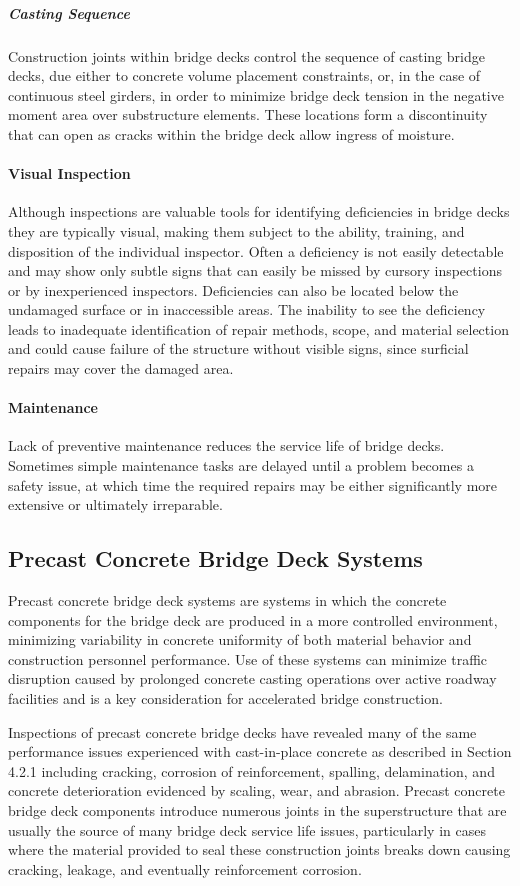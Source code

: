\subparagraph{Casting Sequence}
Construction joints within bridge decks control the sequence of casting bridge decks, due either to concrete
volume placement constraints, or, in the case of continuous steel girders, in order to minimize bridge deck tension in the negative moment area over substructure elements. These locations form a discontinuity that can open as cracks
within the bridge deck allow ingress of moisture.


\paragraph{Visual Inspection}
Although inspections are valuable tools for identifying deficiencies in bridge decks they are typically visual,
making them subject to the ability, training, and disposition of the individual inspector. Often a deficiency is not
easily detectable and may show only subtle signs that can easily be missed by cursory inspections or by
inexperienced inspectors. Deficiencies can also be located below the undamaged surface or in inaccessible areas. The
inability to see the deficiency leads to inadequate identification of repair methods, scope, and material selection and
could cause failure of the structure without visible signs, since surficial repairs may cover the damaged area.

\paragraph{Maintenance}
Lack of preventive maintenance reduces the service life of bridge decks. Sometimes simple maintenance tasks
are delayed until a problem becomes a safety issue, at which time the required repairs may be either significantly
more extensive or ultimately irreparable.


\subsection{Precast Concrete Bridge Deck Systems}
Precast concrete bridge deck systems are systems in which the concrete components for the bridge deck are
produced in a more controlled environment, minimizing variability in concrete uniformity of both material behavior
and construction personnel performance. Use of these systems can minimize traffic disruption caused by prolonged
concrete casting operations over active roadway facilities and is a key consideration for accelerated bridge
construction.

Inspections of precast concrete bridge decks have revealed many of the same performance issues experienced
with cast-in-place concrete as described in Section 4.2.1 including cracking, corrosion of reinforcement, spalling,
delamination, and concrete deterioration evidenced by scaling, wear, and abrasion. Precast concrete bridge deck
components introduce numerous joints in the superstructure that are usually the source of many bridge deck service
life issues, particularly in cases where the material provided to seal these construction joints breaks down causing
cracking, leakage, and eventually reinforcement corrosion.

